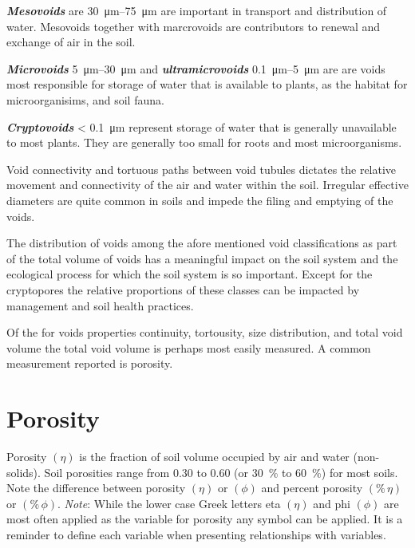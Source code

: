 \documentclass{book}
\begin{document}
\textbf{\textit{Mesovoids}} are \qtyrange{30}{75}{\micro\metre} are important in transport and distribution of water. Mesovoids together with marcrovoids are contributors to renewal and exchange of air in the soil.  

\textbf{\textit{Microvoids}} \qtyrange{5}{30}{\micro\metre} and \textbf{\textit{ultramicrovoids}} \qtyrange{0.1}{5}{\micro\metre} are are voids most responsible for storage of water that is available to plants, as the habitat for microorganisims, and soil fauna.  

\textbf{\textit{Cryptovoids}} \textless{} \qty{0.1}{\micro\metre} represent storage of water that is generally unavailable to most plants. They are generally too small for roots and most microorganisms.  

Void connectivity and tortuous paths between void tubules dictates the relative movement and connectivity of the air and water within the soil. Irregular effective diameters are quite common in soils and impede the filing and emptying of the voids.  

The distribution of voids among the afore mentioned void classifications as part of the total volume of voids has a meaningful impact on the soil system and the ecological process for which the soil system is so important. Except for the cryptopores the relative proportions of these classes can be impacted by management and soil health practices.  

Of the for voids properties continuity, tortousity, size distribution, and total void volume the total void volume is perhaps most easily measured. A common measurement reported is porosity.  

\section{Porosity}
\label{porosity}

Porosity $\left(\eta\right)$ is the fraction of soil volume occupied by air and water (non-solids). Soil porosities range from 0.30 to 0.60 (or \qty{30}{\percent} to \qty{60}{\percent}) for most soils. Note the difference between porosity $\left(\eta\right)$ or $\left(\phi\right)$ and percent porosity $\left(\%\,\eta\right)$ or $\left(\%\,\phi\right)$. \emph{Note}: While the lower case Greek letters eta $\left(\eta\right)$ and phi $\left(\phi\right)$ are most often applied as the variable for porosity any symbol can be applied. It is a reminder to define each variable when presenting relationships with variables. 
\end{document}
